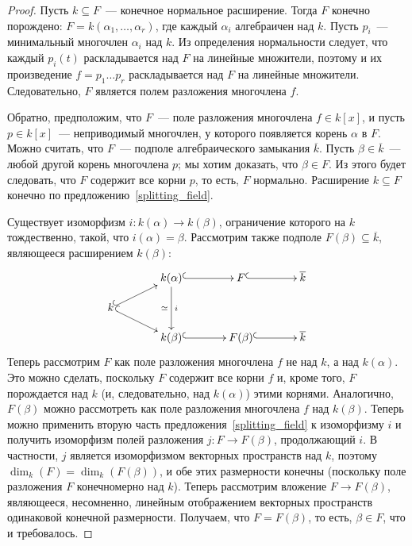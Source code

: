 \documentclass[a4paper,11pt]{scrartcl}
\theoremstyle{plain}
\theoremstyle{definition}
\newcommand\sseq{\subseteq}
\begin{document}
\begin{proof}
Пусть $k\sseq F$~--- конечное нормальное расширение. Тогда $F$ конечно
порождено: $F=k(\alpha_1,\dots,\alpha_r)$, где каждый $\alpha_i$
алгебраичен над
$k$. Пусть $p_i$~--- минимальный многочлен $\alpha_i$ над $k$. Из
определения нормальности следует, что каждый $p_i(t)$ раскладывается
над $F$ на линейные множители, поэтому и их произведение $f=p_1\dots
p_r$ раскладывается над $F$ на линейные множители. Следовательно, $F$
является полем разложения многочлена $f$.

Обратно, предположим, что $F$~--- поле разложения многочлена $f\in
k[x]$, и пусть $p\in k[x]$~--- неприводимый многочлен, у которого
появляется корень $\alpha$ в $F$. Можно считать, что $F$~--- подполе
алгебраического замыкания $\overline{k}$. Пусть
$\beta\in\overline{k}$~--- любой другой корень многочлена $p$; мы
хотим доказать, что $\beta\in F$. Из этого будет следовать, что $F$
содержит все корни $p$, то есть, $F$ нормально. Расширение
$k\sseq F$ конечно по предложению~\ref{splitting_field}.

Существует изоморфизм $i\colon k(\alpha)\to k(\beta)$, ограничение
которого
на $k$ тождественно, такой, что $i(\alpha)=\beta$. Рассмотрим также
подполе
$F(\beta)\sseq\overline{k}$, являющееся расширением $k(\beta)$:
$$
\xymatrixcolsep{3pc}
\xymatrixrowsep{1pc}
\xymatrix{& k(\alpha)\ar[dd]_{\simeq}^i\ar@{^{(}->}[r] & F \ar@{^{(}->}[r] & \overline{k}\\
k\ar@{^{(}->}[ur]\ar@{^{(}->}[dr] \\
& k(\beta)\ar@{^{(}->}[r] & F(\beta)\ar@{^{(}->}[r] & \overline{k}}
$$
Теперь рассмотрим $F$ как поле разложения многочлена $f$ не над $k$, а
над $k(\alpha)$. Это можно сделать, поскольку $F$ содержит все корни
$f$ и, кроме того, $F$ порождается над $k$ (и, следовательно, над
$k(\alpha)$) этими корнями. Аналогично, $F(\beta)$ можно рассмотреть
как поле разложения многочлена $f$ над $k(\beta)$. Теперь можно
применить вторую часть предложения~\ref{splitting_field} к изоморфизму
$i$ и получить изоморфизм полей разложения $j\colon F\to F(\beta)$,
продолжающий $i$. В частности, $j$ является изоморфизмом векторных
пространств над $k$, поэтому $\dim_k(F)=\dim_k(F(\beta))$, и обе этих
размерности конечны (поскольку поле разложения $F$ конечномерно над
$k$). Теперь рассмотрим вложение $F\to F(\beta)$, являющееся,
несомненно, линейным отображением векторных пространств одинаковой
конечной размерности. Получаем, что $F=F(\beta)$, то есть, $\beta\in
F$, что и требовалось.
\end{proof}
\end{document}
